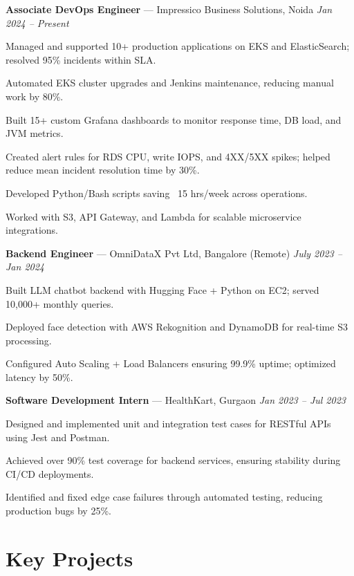\documentclass[letterpaper,10pt]{article}
\newcommand{\jobHeading}[3]{
  \noindent\textbf{#1} — #2 \hfill \textit{#3} \\
}
\newenvironment{resume_list}{
  \vspace{-6pt}
  \begin{itemize}[itemsep=2pt, leftmargin=18pt]
}{\end{itemize}}
\begin{document}
\jobHeading{Associate DevOps Engineer}{Impressico Business Solutions, Noida}{Jan 2024 – Present}
\begin{resume_list}
  \item Managed and supported 10+ production applications on EKS and ElasticSearch; resolved 95\% incidents within SLA.
  \item Automated EKS cluster upgrades and Jenkins maintenance, reducing manual work by 80\%.
   \item Built 15+ custom Grafana dashboards to monitor response time, DB load, and JVM metrics.
  \item Created alert rules for RDS CPU, write IOPS, and 4XX/5XX spikes; helped reduce mean incident resolution time by 30\%.
  \item Developed Python/Bash scripts saving ~15 hrs/week across operations.
  \item Worked with S3, API Gateway, and Lambda for scalable microservice integrations.
\end{resume_list}
\jobHeading{Backend Engineer}{OmniDataX Pvt Ltd, Bangalore (Remote)}{July 2023 – Jan 2024}
\begin{resume_list}
  \item Built LLM chatbot backend with Hugging Face + Python on EC2; served 10,000+ monthly queries.
  \item Deployed face detection with AWS Rekognition and DynamoDB for real-time S3 processing.
  \item Configured Auto Scaling + Load Balancers ensuring 99.9\% uptime; optimized latency by 50\%.
\end{resume_list}

\jobHeading{Software Development Intern}{HealthKart, Gurgaon}{Jan 2023 – Jul 2023}
\begin{resume_list}
  \item Designed and implemented unit and integration test cases for RESTful APIs using Jest and Postman.
  \item Achieved over 90\% test coverage for backend services, ensuring stability during CI/CD deployments.
  \item Identified and fixed edge case failures through automated testing, reducing production bugs by 25\%.
\end{resume_list}


\section{Key Projects}
\end{document}
